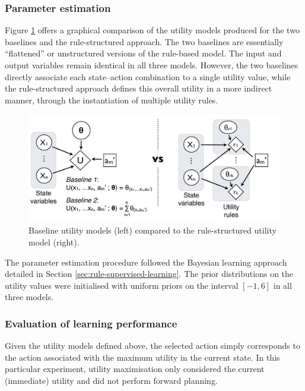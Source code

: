 \subsubsection*{Parameter estimation}

Figure \ref{fig:exp1_baselines} offers a graphical comparison of the utility models produced for the two baselines and the rule-structured approach.  The two baselines are essentially ``flattened'' or unstructured versions of the rule-based model.  The input and output variables remain identical in all three models. However, the two baselines directly associate each state--action combination to a single utility value, while the rule-structured approach defines this overall utility in a more indirect manner, through the instantiation of multiple utility rules. 

\begin{figure}[ht]
\centering
\includegraphics[scale=0.40]{imgs/exp1_baselines.pdf}
\caption{Baseline utility models (left) compared to the rule-structured utility model (right).}
\label{fig:exp1_baselines}
\end{figure}


The parameter estimation procedure followed the Bayesian learning approach detailed in Section \ref{sec:rule-supervised-learning}.  The prior distributions on the utility values were initialised with uniform priors on the interval $[-1,6]$ in all three models. 


\subsubsection*{Evaluation of learning performance}
Given the utility models defined above, the selected action simply corresponds to the action associated with the maximum utility in the current state. In this particular experiment, utility maximisation only considered the current (immediate) utility and did not perform forward planning.

